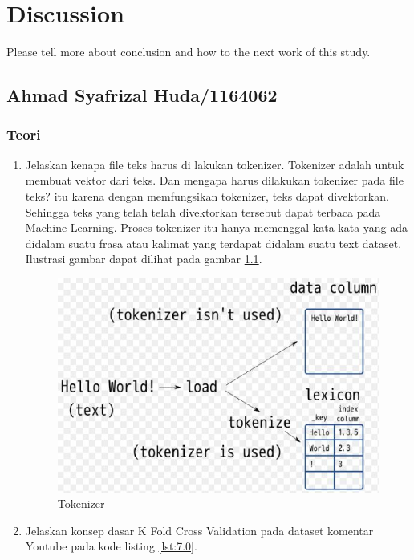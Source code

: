 \chapter{Discussion}
Please tell more about conclusion and how to the next work of this study.

\section{Ahmad Syafrizal Huda/1164062}
\subsection{Teori}
\begin{enumerate}
\item Jelaskan kenapa file teks harus di lakukan tokenizer.
\subitem Tokenizer adalah untuk membuat vektor dari teks. Dan mengapa harus dilakukan tokenizer pada file teks? itu karena dengan memfungsikan tokenizer, teks dapat divektorkan. Sehingga teks yang telah telah divektorkan tersebut dapat terbaca pada Machine Learning. Proses tokenizer itu hanya memenggal kata-kata yang ada didalam suatu frasa atau kalimat yang terdapat didalam suatu text dataset. Ilustrasi gambar dapat dilihat pada gambar \ref{c7_1}.
\begin{figure}[!htbp]
	\centerline{\includegraphics[width=1\textwidth]{figures/huda/chapter7/1.JPG}}
	\caption{Tokenizer}
	\label{c7_1}
\end{figure}
\item Jelaskan konsep dasar K Fold Cross Validation pada dataset komentar Youtube pada kode listing \ref{lst:7.0}.
\begin{lstlisting}[caption=K Fold Cross Validation,label={lst:7.0}]

\end{lstlisting}
\end{enumerate}
